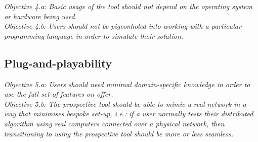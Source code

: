 \emph{Objective 4.a: Basic usage of the tool should not depend on the operating system or hardware being used.} \\
\emph{Objective 4.b: Users should not be pigeonholed into working with a particular programming language in order to
simulate their solution.}

\subsection{Plug-and-playability}\label{subsection:plug_and_playability}

\emph{Objective 5.a: Users should need minimal domain-specific knowledge in order to use the full set of features on
offer.} \\
\emph{Objective 5.b: The prospective tool should be able to mimic a real network in a way that minimises bespoke set-up,
    i.e.: if a user normally tests their distributed algorithm using real computers connected over a physical
    network, then transitioning to using the prospective tool should be more or less seamless.}
